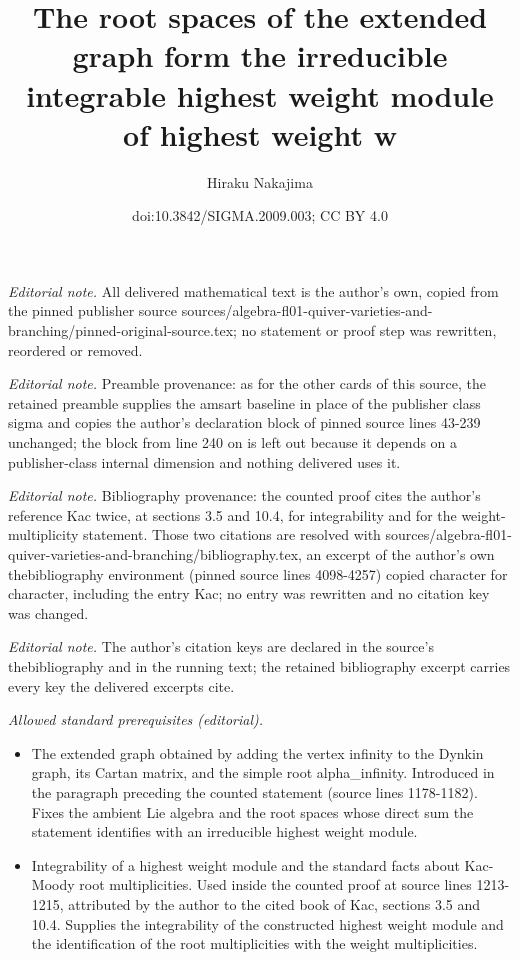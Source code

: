 \documentclass[10pt,a4paper]{amsart}
\title{The root spaces of the extended graph form the irreducible integrable highest weight module of highest weight w}
\author{Hiraku Nakajima}
\date{doi:10.3842/SIGMA.2009.003; CC BY 4.0}
\theoremstyle{definition}
\numberwithin{equation}{section}
\begin{document}
\maketitle
\noindent\textit{Editorial note.} All delivered mathematical text is the author's own, copied from the pinned publisher source sources/algebra-fl01-quiver-varieties-and-branching/pinned-original-source.tex; no statement or proof step was rewritten, reordered or removed.\par\medskip
\noindent\textit{Editorial note.} Preamble provenance: as for the other cards of this source, the retained preamble supplies the amsart baseline in place of the publisher class sigma and copies the author's declaration block of pinned source lines 43-239 unchanged; the block from line 240 on is left out because it depends on a publisher-class internal dimension and nothing delivered uses it.\par\medskip
\noindent\textit{Editorial note.} Bibliography provenance: the counted proof cites the author's reference Kac twice, at sections 3.5 and 10.4, for integrability and for the weight-multiplicity statement. Those two citations are resolved with sources/algebra-fl01-quiver-varieties-and-branching/bibliography.tex, an excerpt of the author's own thebibliography environment (pinned source lines 4098-4257) copied character for character, including the entry Kac; no entry was rewritten and no citation key was changed.\par\medskip
\noindent\textit{Editorial note.} The author's citation keys are declared in the source's thebibliography and in the running text; the retained bibliography excerpt carries every key the delivered excerpts cite.\par\medskip
\noindent\textit{Allowed standard prerequisites (editorial).}\begin{itemize}
\item The extended graph obtained by adding the vertex infinity to the Dynkin graph, its Cartan matrix, and the simple root alpha\_infinity. Introduced in the paragraph preceding the counted statement (source lines 1178-1182). Fixes the ambient Lie algebra and the root spaces whose direct sum the statement identifies with an irreducible highest weight module.
\item Integrability of a highest weight module and the standard facts about Kac-Moody root multiplicities. Used inside the counted proof at source lines 1213-1215, attributed by the author to the cited book of Kac, sections 3.5 and 10.4. Supplies the integrability of the constructed highest weight module and the identification of the root multiplicities with the weight multiplicities.
\end{itemize}\medskip
\end{document}
